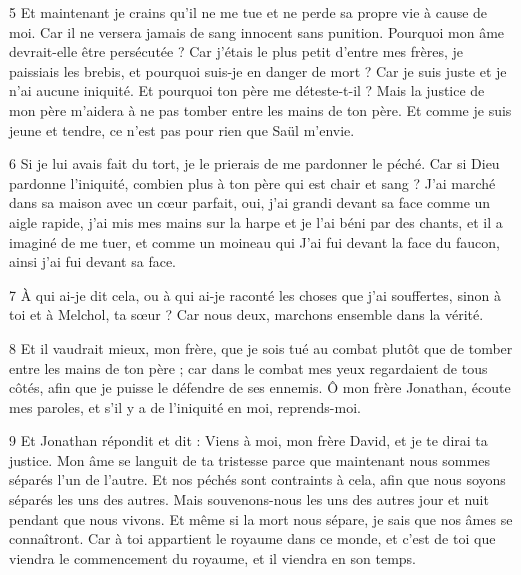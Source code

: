 \par 5 Et maintenant je crains qu'il ne me tue et ne perde sa propre vie à cause de moi. Car il ne versera jamais de sang innocent sans punition. Pourquoi mon âme devrait-elle être persécutée ? Car j'étais le plus petit d'entre mes frères, je paissiais les brebis, et pourquoi suis-je en danger de mort ? Car je suis juste et je n'ai aucune iniquité. Et pourquoi ton père me déteste-t-il ? Mais la justice de mon père m'aidera à ne pas tomber entre les mains de ton père. Et comme je suis jeune et tendre, ce n’est pas pour rien que Saül m’envie.

\par 6 Si je lui avais fait du tort, je le prierais de me pardonner le péché. Car si Dieu pardonne l'iniquité, combien plus à ton père qui est chair et sang ? J'ai marché dans sa maison avec un cœur parfait, oui, j'ai grandi devant sa face comme un aigle rapide, j'ai mis mes mains sur la harpe et je l'ai béni par des chants, et il a imaginé de me tuer, et comme un moineau qui J'ai fui devant la face du faucon, ainsi j'ai fui devant sa face.

\par 7 À qui ai-je dit cela, ou à qui ai-je raconté les choses que j'ai souffertes, sinon à toi et à Melchol, ta sœur ? Car nous deux, marchons ensemble dans la vérité.

\par 8 Et il vaudrait mieux, mon frère, que je sois tué au combat plutôt que de tomber entre les mains de ton père ; car dans le combat mes yeux regardaient de tous côtés, afin que je puisse le défendre de ses ennemis. Ô mon frère Jonathan, écoute mes paroles, et s'il y a de l'iniquité en moi, reprends-moi.

\par 9 Et Jonathan répondit et dit : Viens à moi, mon frère David, et je te dirai ta justice. Mon âme se languit de ta tristesse parce que maintenant nous sommes séparés l'un de l'autre. Et nos péchés sont contraints à cela, afin que nous soyons séparés les uns des autres. Mais souvenons-nous les uns des autres jour et nuit pendant que nous vivons. Et même si la mort nous sépare, je sais que nos âmes se connaîtront. Car à toi appartient le royaume dans ce monde, et c'est de toi que viendra le commencement du royaume, et il viendra en son temps.

